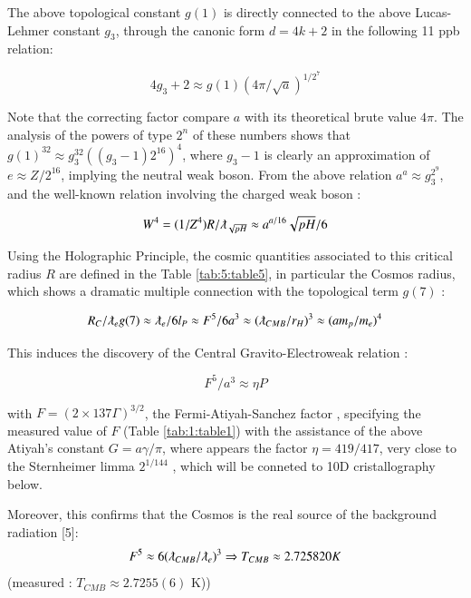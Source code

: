 \documentclass[a4paper,9pt]{article}
\begin{document}
The above topological constant $g(1)$ is directly connected to the above Lucas-Lehmer constant $g_3$, through the canonic form $d = 4k+2$ in the following 11 ppb relation:

\begin{equation}
4g_3 +2  \approx g(1) (4\pi/\sqrt a)^{1/2^7} 
\end{equation}

Note that the correcting factor compare $a$ with its theoretical brute value $4\pi$. The analysis of the powers of type $2^n$ of these numbers shows that $g(1)^{32} \approx g_3^{32}((g_3 - 1) 2^{16})^4$, where $g_3 - 1$ is clearly an approximation of $e \approx Z/2^{16}$, implying the neutral weak boson. From the above relation $ a^a \approx g_3^{2^9}$, and the well-known relation involving the charged weak boson \cite{Sanchez}:

\begin{equation}
W^4 = (1/Z^4)R/\lambdabar_{\sqrt{pH}} \approx a^{a/16} \sqrt{pH}/6  
\end{equation}

Using the Holographic Principle, the cosmic quantities associated to this critical radius $R$ are defined in the Table \ref{tab:5:table5}, in particular the Cosmos radius, which shows a dramatic multiple connection with the topological term $g(7)$ :

\begin{equation}
R_{C}/\lambdabar_{e} g(7) \approx  \lambdabar_{e}/6l_P \approx F^5/6a^3 \approx (\lambdabar_{CMB}/r_H)^3 \approx  (am_p/m_e)^4  
\end{equation}

This induces the discovery of the Central Gravito-Electroweak relation :

\begin{equation*}
F^5/a^3 \approx \eta P    
\end{equation*}{}
  

with  $F = (2\times 137 \Gamma)^{3/2}$, the Fermi-Atiyah-Sanchez factor \cite{Sanchez}, specifying the measured value of  $F$ (Table \ref{tab:1:table1}) with the assistance of the above Atiyah's constant $G = a \gamma/ \pi$, where appears the factor $\eta = 419/417$, very close to the Sternheimer limma $2^{1/144}$ \cite{Sternheimer}, which will be conneted to 10D cristallography below.


Moreover, this confirms that the Cosmos is the real source of the background radiation [5]:
\begin{equation}
F^5  \approx 6(\lambdabar_{CMB}/\lambdabar_{e})^3 \Rightarrow  T_{CMB}  \approx  2.725820 K  
\end{equation}
(measured : $T_{CMB}  \approx  2.7255(6)$ K))
\end{document}
